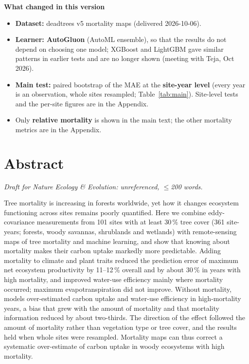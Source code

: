 \documentclass[11pt,a4paper]{article}
\begin{document}
\medskip
\textbf{What changed in this version}
\begin{itemize}
  \item \textbf{Dataset:} deadtrees v5 mortality maps (delivered 2026-10-06).
  \item \textbf{Learner: AutoGluon} (AutoML ensemble), so that the results do not depend on choosing one model; XGBoost and LightGBM
        gave similar patterns in earlier tests and are no longer shown (meeting with Teja, Oct 2026).
  \item \textbf{Main test:} paired bootstrap of the MAE at the \textbf{site-year level} (every year is an observation, whole
        sites resampled; Table~\ref{tab:main}). Site-level tests and the per-site figures are in the Appendix.
  \item Only \textbf{relative mortality} is shown in the main text; the other mortality metrics are in the Appendix.
\end{itemize}

\clearpage
\section*{Abstract}
{\small\textit{Draft for Nature Ecology \& Evolution: unreferenced, $\leq$200 words.}}

Tree mortality is increasing in forests worldwide, yet how it changes ecosystem functioning across sites remains
poorly quantified. Here we combine eddy-covariance measurements from 101 sites with at least 30\,\% tree cover (361 site-years;
forests, woody savannas, shrublands and wetlands) with
remote-sensing maps of tree mortality and machine learning, and show that knowing about mortality makes their carbon
uptake markedly more predictable. Adding mortality to climate and plant traits reduced the prediction error of maximum
net ecosystem productivity by 11--12\,\% overall and by about 30\,\% in years with high mortality, and improved
water-use efficiency mainly where mortality occurred; maximum evapotranspiration did not improve. Without mortality,
models over-estimated carbon uptake and water-use efficiency in high-mortality years, a bias that grew with the amount of
mortality and that mortality information reduced by about two-thirds. The direction of the effect followed the amount of
mortality rather than vegetation type or tree cover, and the results held when whole sites were resampled.
Mortality maps can thus correct a systematic over-estimate of
carbon uptake in woody ecosystems with high mortality.
\end{document}
